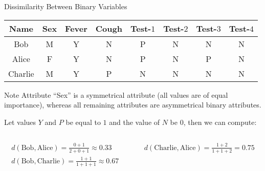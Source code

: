 \begin{frame}{Dissimilarity Between Binary Variables}
	\begin{center}
		\begin{tabular}{c | c | c | c | c | c | c | c}
			\textbf{Name} & \textbf{Sex} & \textbf{Fever} & \textbf{Cough} & \textbf{Test-$1$} & \textbf{Test-$2$} & \textbf{Test-$3$} & \textbf{Test-$4$} \\\hline
			Bob           & M            & Y              & N              & P                 & N                 & N                 & N                 \\
			Alice         & F            & Y              & N              & P                 & N                 & P                 & N                 \\
			Charlie       & M            & Y              & P              & N                 & N                 & N                 & N                 \\
		\end{tabular}
	\end{center}

	\begin{alertblock}{Note}
		Attribute ``Sex'' is a symmetrical attribute (all values are of equal importance), whereas all remaining attributes are asymmetrical binary attributes.
	\end{alertblock}

	Let values $Y$ and $P$ be equal to $1$ and the value of $N$ be $0$, then we can compute:

	\vspace*{-2em}
	\begin{columns}
		\begin{column}{0.5\textwidth}
			\begin{align*}
				d(\text{Bob}, \text{Alice}) = \frac{0+1}{2+0+1} \approx 0.33 \\
				d(\text{Bob}, \text{Charlie}) = \frac{1+1}{1+1+1} \approx 0.67
			\end{align*}
		\end{column}
		\begin{column}{0.5\textwidth}
			\begin{align*}
				d(\text{Charlie}, \text{Alice}) = \frac{1+2}{1+1+2} = 0.75
			\end{align*}
		\end{column}
	\end{columns}
\end{frame}

